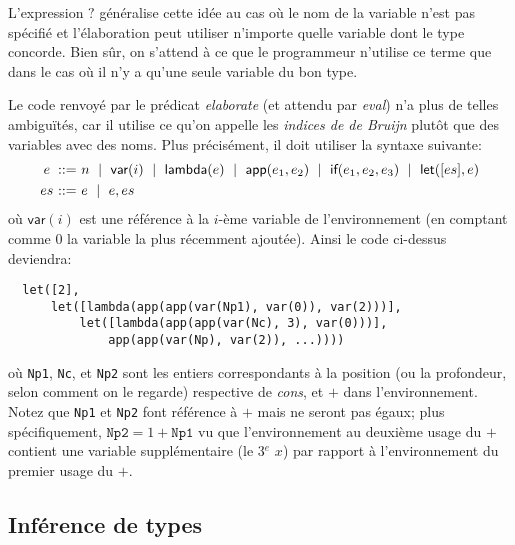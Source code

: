 \documentclass{article}
\newcommand \kw [1] {\textsf{#1}}
\newcommand \id [1] {\textsl{#1}}
\renewcommand \: {\!:\!}
\begin{document}
L'expression $?$ généralise cette idée au cas où le nom de la variable n'est
pas spécifié et l'élaboration peut utiliser n'importe quelle variable dont
le type concorde.  Bien sûr, on s'attend à ce que le programmeur n'utilise
ce terme que dans le cas où il n'y a qu'une seule variable du bon type.

Le code renvoyé par le prédicat \id{elaborate} (et attendu par \id{eval})
n'a plus de telles ambiguïtés, car il utilise ce qu'on appelle les
\emph{indices de de Bruijn} %
plutôt que des variables avec des noms.  Plus précisément, il
doit utiliser la syntaxe suivante:
\begin{displaymath}
  \begin{array}{c@{~::=~}l}
    e & n ~\mid~ \kw{var}(i) ~\mid~ \kw{lambda}(e) ~\mid~ \kw{app}(e_1,e_2)
    ~\mid~ \kw{if}(e_1,e_2,e_3) ~\mid~ \kw{let}([es],e) \smallskip\\
    es & e ~\mid~ e, es
  \end{array}
\end{displaymath}
%
où $\kw{var}(i)$ est une référence à la $i$-ème variable de l'environnement
(en comptant comme 0 la variable la plus récemment ajoutée).
Ainsi le code ci-dessus deviendra:
\begin{verbatim}
  let([2],
      let([lambda(app(app(var(Np1), var(0)), var(2)))],
          let([lambda(app(app(var(Nc), 3), var(0)))],
              app(app(var(Np), var(2)), ...))))
\end{verbatim}
où \texttt{Np1}, \texttt{Nc}, et \texttt{Np2} sont les entiers correspondants
à la position (ou la profondeur, selon comment on le regarde) respective de
\id{cons}, et $+$ dans l'environnement.  Notez que \texttt{Np1} et
\texttt{Np2} font référence à $+$ mais ne seront pas égaux; plus
spécifiquement, $\texttt{Np2} = 1+\texttt{Np1}$ vu que l'environnement au
deuxième usage du $+$ contient une variable supplémentaire (le 3$^e$ $x$)
par rapport à l'environnement du premier usage du $+$.

\subsection{Inférence de types}

\newcommand \CheckKind [1] {\vdash #1}
\newcommand \CheckType [2][\Gamma] {#1 \vdash #2 ~:~}
\newcommand \InferType [2][\Gamma] {#1 \vdash #2 ~:~}
\newcommand \BothType [2][\Gamma] {#1 \vdash #2 ~:~}
\newcommand \Axiom [2] { \mbox{}\hspace{10pt}\nolinebreak\ensuremath{\displaystyle
    \frac{#1}{#2}}\nolinebreak\hspace{10pt}\mbox{} \medskip}
\newcommand \HA {\hspace{13pt}}
\renewcommand \: {\!:\!}
\end{document}
